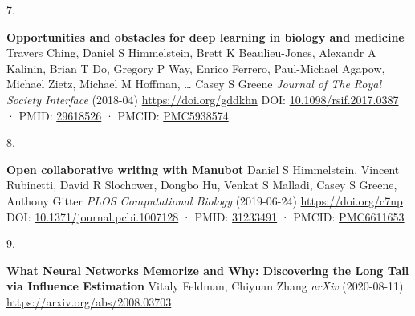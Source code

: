 \documentclass[
]{article}
\newlength{\cslhangindent}
\newlength{\csllabelwidth}
\newlength{\cslentryspacingunit} %
\newenvironment{CSLReferences}[2] %
 {%
  \setlength{\parindent}{0pt}
  \ifodd #1
  \let\oldpar\par
  \def\par{\hangindent=\cslhangindent\oldpar}
  \fi
  \setlength{\parskip}{#2\cslentryspacingunit}
 }%
 {}
\newcommand{\CSLBlock}[1]{#1\hfill\break}
\newcommand{\CSLLeftMargin}[1]{\parbox[t]{\csllabelwidth}{#1}}
\newcommand{\CSLRightInline}[1]{\parbox[t]{\linewidth - \csllabelwidth}{#1}\break}
\begin{document}
\begin{CSLReferences}{0}{0}
\leavevmode{}%
\CSLLeftMargin{7. }%
\CSLRightInline{\textbf{Opportunities and obstacles for deep learning in biology and medicine}
\CSLBlock{Travers Ching, Daniel S Himmelstein, Brett K Beaulieu-Jones, Alexandr A Kalinin, Brian T Do, Gregory P Way, Enrico Ferrero, Paul-Michael Agapow, Michael Zietz, Michael M Hoffman, \ldots{} Casey S Greene} \emph{Journal of The Royal Society Interface} (2018-04) \url{https://doi.org/gddkhn}
\CSLBlock{DOI: \href{https://doi.org/10.1098/rsif.2017.0387}{10.1098/rsif.2017.0387} · PMID: \href{https://www.ncbi.nlm.nih.gov/pubmed/29618526}{29618526} · PMCID: \href{https://www.ncbi.nlm.nih.gov/pmc/articles/PMC5938574}{PMC5938574}}}

\leavevmode{}%
\CSLLeftMargin{8. }%
\CSLRightInline{\textbf{Open collaborative writing with Manubot}
\CSLBlock{Daniel S Himmelstein, Vincent Rubinetti, David R Slochower, Dongbo Hu, Venkat S Malladi, Casey S Greene, Anthony Gitter} \emph{PLOS Computational Biology} (2019-06-24) \url{https://doi.org/c7np}
\CSLBlock{DOI: \href{https://doi.org/10.1371/journal.pcbi.1007128}{10.1371/journal.pcbi.1007128} · PMID: \href{https://www.ncbi.nlm.nih.gov/pubmed/31233491}{31233491} · PMCID: \href{https://www.ncbi.nlm.nih.gov/pmc/articles/PMC6611653}{PMC6611653}}}

\leavevmode{}%
\CSLLeftMargin{9. }%
\CSLRightInline{\textbf{What Neural Networks Memorize and Why: Discovering the Long Tail via Influence Estimation}
\CSLBlock{Vitaly Feldman, Chiyuan Zhang} \emph{arXiv} (2020-08-11) \url{https://arxiv.org/abs/2008.03703}}

\end{CSLReferences}
\end{document}
